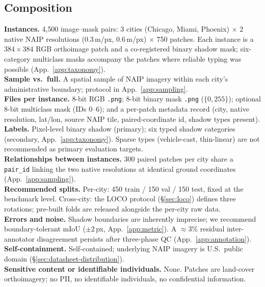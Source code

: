 \subsection{Composition}
\textbf{Instances.} 4{,}500 image--mask pairs: 3 cities (Chicago, Miami, Phoenix)
$\times$ 2 native NAIP resolutions (0.3\,m/px, 0.6\,m/px) $\times$ 750 patches.
Each instance is a $384\!\times\!384$ RGB orthoimage patch and a co-registered
binary shadow mask; six-category multiclass masks accompany the patches where
reliable typing was possible (App.~\ref{app:taxonomy}).\\
\textbf{Sample vs.\ full.} A spatial sample of NAIP imagery within each city's
administrative boundary; protocol in App.~\ref{app:sampling}.\\
\textbf{Files per instance.} 8-bit RGB \texttt{.png}; 8-bit binary mask \texttt{.png}
($\{0, 255\}$); optional 8-bit multiclass mask (IDs 0--6); and a per-patch metadata
record (city, native resolution, lat/lon, source NAIP tile, paired-coordinate id,
shadow types present).\\
\textbf{Labels.} Pixel-level binary shadow (primary); six typed shadow categories
(secondary, App.~\ref{app:taxonomy}). Sparse types (vehicle-cast, thin-linear)
are not recommended as primary evaluation targets.\\
\textbf{Relationships between instances.} 300 paired patches per city share a
\texttt{pair\_id} linking the two native resolutions at identical ground coordinates
(App.~\ref{app:sampling}).\\
\textbf{Recommended splits.} Per-city: 450 train / 150 val / 150 test, fixed at the
benchmark level. Cross-city: the LOCO protocol (\S\ref{sec:loco}) defines three
rotations; pre-built folds are released alongside the per-city raw data.\\
\textbf{Errors and noise.} Shadow boundaries are inherently imprecise; we recommend
boundary-tolerant mIoU ($\pm 2$\,px, App.~\ref{app:metric}). A $\approx 3\%$ residual
inter-annotator disagreement persists after three-phase QC (App.~\ref{app:annotation}).\\
\textbf{Self-containment.} Self-contained; underlying NAIP imagery is U.S.\ public
domain (\S\ref{sec:datasheet-distribution}).\\
\textbf{Sensitive content or identifiable individuals.} None. Patches are land-cover
orthoimagery; no PII, no identifiable individuals, no confidential information.

